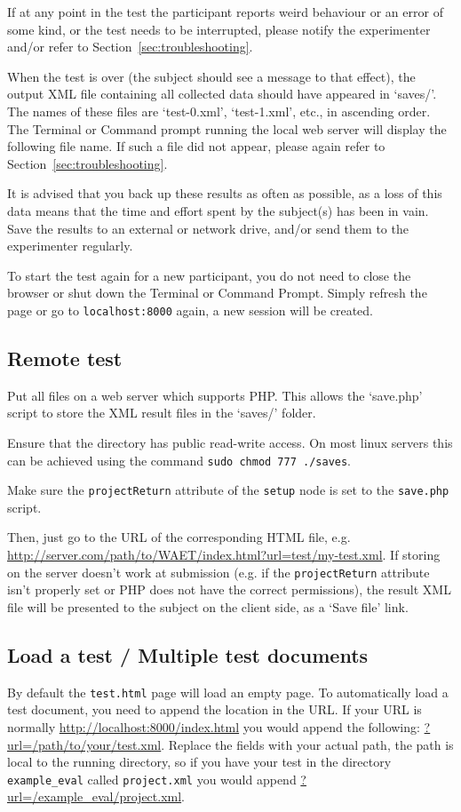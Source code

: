 \documentclass[11pt, oneside]{article}   	%
\begin{document}
	        If at any point in the test the participant reports weird behaviour or an error of some kind, or the test needs to be interrupted, please notify the experimenter and/or refer to Section~\ref{sec:troubleshooting}.
			
			When the test is over (the subject should see a message to that effect), the output XML file containing all collected data should have appeared in `saves/'. The names of these files are `test-0.xml', `test-1.xml', etc., in ascending order. The Terminal or Command prompt running the local web server will display the following file name. If such a file did not appear, please again refer to Section~\ref{sec:troubleshooting}. %
			
			It is advised that you back up these results as often as possible, as a loss of this data means that the time and effort spent by the subject(s) has been in vain. Save the results to an external or network drive, and/or send them to the experimenter regularly. 
			
			To start the test again for a new participant, you do not need to close the browser or shut down the Terminal or Command Prompt. Simply refresh the page or go to \texttt{localhost:8000} again, a new session will be created.
		

	\subsection{Remote test}
		Put all files on a web server which supports PHP. This allows the `save.php' script to store the XML result files in the `saves/' folder. 
		
		Ensure that the  directory has public read-write access. On most linux servers this can be achieved using the command \texttt{sudo chmod 777 ./saves}.

		Make sure the \texttt{projectReturn} attribute of the \texttt{setup} node is set to the \texttt{save.php} script. 

		Then, just go to the URL of the corresponding HTML file, e.g. \url{http://server.com/path/to/WAET/index.html?url=test/my-test.xml}. If storing on the server doesn't work at submission (e.g. if the \texttt{projectReturn} attribute isn't properly set or PHP does not have the correct permissions), the result XML file will be presented to the subject on the client side, as a `Save file' link. 

    \subsection{Load a test / Multiple test documents}
        By default the \texttt{test.html} page will load an empty page. To automatically load a test document, you need to append the location in the URL. If your URL is normally \url{http://localhost:8000/index.html} you would append the following: \url{?url=/path/to/your/test.xml}. Replace the fields with your actual path, the path is local to the running directory, so if you have your test in the directory \texttt{example\_eval} called \texttt{project.xml} you would append \url{?url=/example\_eval/project.xml}.
\end{document}
